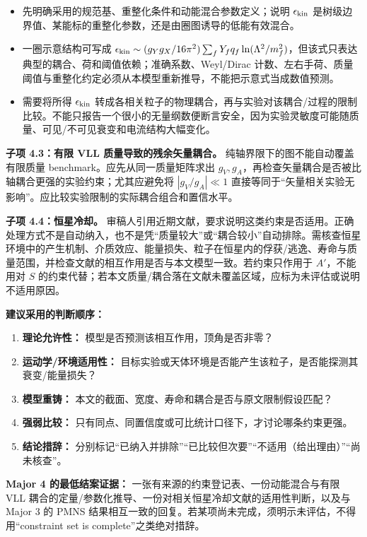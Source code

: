 \documentclass[
]{article}
\providecommand{\tightlist}{%
  \setlength{\itemsep}{0pt}\setlength{\parskip}{0pt}}
\begin{document}
\begin{itemize}
\tightlist
\item
  先明确采用的规范基、重整化条件和动能混合参数定义；说明
  \(\epsilon_{\rm kin}\)
  是树级边界值、某能标的重整化参数，还是由圈图诱导的低能有效混合。
\item
  一圈示意结构可写成
  \(\epsilon_{\rm kin}\sim(g_Yg_X/16\pi^2)\sum_f Y_fq_f\ln(\Lambda^2/m_f^2)\)，但该式只表达典型的耦合、荷和阈值依赖；准确系数、Weyl/Dirac
  计数、左右手荷、质量阈值与重整化约定必须从本模型重新推导，不能把示意式当成数值预测。
\item
  需要将所得 \(\epsilon_{\rm kin}\)
  转成各相关粒子的物理耦合，再与实验对该耦合/过程的限制比较。不能只报告一个很小的无量纲数便断言安全，因为实验灵敏度可能随质量、可见/不可见衰变和电流结构大幅变化。
\end{itemize}

\textbf{子项 4.3：有限 VLL 质量导致的残余矢量耦合。}
纯轴界限下的图不能自动覆盖有限质量 benchmark。应先从同一质量矩阵求出
\(g_V,g_A\)，再检查矢量耦合是否被比轴耦合更强的实验约束；尤其应避免将
\(|g_V/g_A|\ll1\)
直接等同于``矢量相关实验无影响''。应比较实验限制的实际耦合组合和置信水平。

\textbf{子项 4.4：恒星冷却。}
审稿人引用近期文献，要求说明这类约束是否适用。正确处理方式不是自动纳入，也不是凭``质量较大''或``耦合较小''自动排除。需核查恒星环境中的产生机制、介质效应、能量损失、粒子在恒星内的俘获/逃逸、寿命与质量范围，并检查文献的相互作用是否与本文模型一致。若约束只作用于
\(A'\)，不能用对 \(S\)
的约束代替；若本文质量/耦合落在文献未覆盖区域，应标为未评估或说明不适用原因。

\textbf{建议采用的判断顺序：}

\begin{enumerate}
\def\labelenumi{\arabic{enumi}.}
\tightlist
\item
  \textbf{理论允许性：} 模型是否预测该相互作用，顶角是否非零？
\item
  \textbf{运动学/环境适用性：}
  目标实验或天体环境是否能产生该粒子，是否能探测其衰变/能量损失？
\item
  \textbf{模型重铸：}
  本文的截面、宽度、寿命和耦合是否与原文限制假设匹配？
\item
  \textbf{强弱比较：}
  只有同点、同置信度或可比统计口径下，才讨论哪条约束更强。
\item
  \textbf{结论措辞：}
  分别标记``已纳入并排除''``已比较但次要''``不适用（给出理由）''``尚未核查''。
\end{enumerate}

\textbf{Major 4 的最低结案证据：}
一张有来源的约束登记表、一份动能混合与有限 VLL
耦合的定量/参数化推导、一份对相关恒星冷却文献的适用性判断，以及与 Major
3 的 PMNS
结果相互一致的回复。若某项尚未完成，须明示未评估，不得用``constraint set
is complete''之类绝对措辞。
\end{document}
